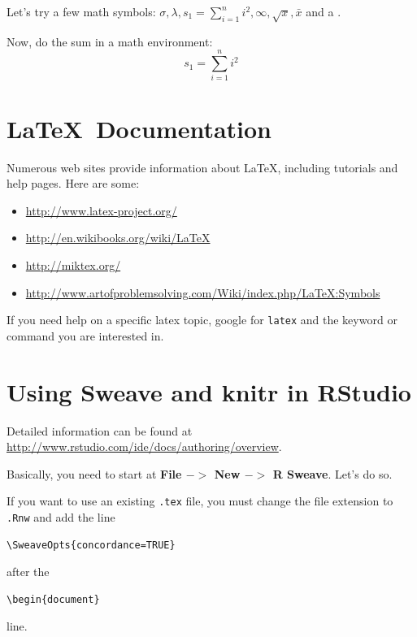 \documentclass[12pt]{article}
\begin{document}
Let's try a few math symbols: $\sigma, \lambda,
s_1 = \sum_{i=1}^n i^2, \infty, \sqrt{x}, \bar{x}$ and a \smiley.


Now, do the sum in a math environment:
\[
s_1 = \sum_{i=1}^n i^2
\]


\section{\LaTeX\ Documentation}

Numerous web sites provide information about \LaTeX,
including tutorials and help pages. Here are some:

\begin{itemize}
\item \url{http://www.latex-project.org/}
\item \url{http://en.wikibooks.org/wiki/LaTeX}
\item \url{http://miktex.org/}
\item \url{http://www.artofproblemsolving.com/Wiki/index.php/LaTeX:Symbols}
\end{itemize}

If you need help on a specific latex topic, google for
\verb|latex| and the keyword or command you are interested in.



\newpage


\section{Using Sweave and knitr in RStudio}

Detailed information can be found at
\url{http://www.rstudio.com/ide/docs/authoring/overview}.

Basically, you need to start at \textbf{File $->$ New $->$ R Sweave}.
Let's do so.


If you want to use an existing \verb|.tex| file, you must change the file
extension to \verb|.Rnw| and add the line
\begin{verbatim}
\SweaveOpts{concordance=TRUE}
\end{verbatim}
after the 
\begin{verbatim}
\begin{document}
\end{verbatim}
line.
 
\end{document}
